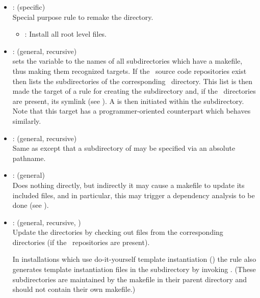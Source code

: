 \begin{itemize}
\item
    : (specific)
   \\ Special purpose rule to remake the  directory.
   \begin{itemize}
   \item
      : Install all root level files.
   \end{itemize}

\item
    : (general, recursive)
   \\  sets the  variable to the names of all
   subdirectories which have a makefile, thus making them recognized targets.
   If the \rcs\ source code repositories exist then  lists
   the subdirectories of the corresponding \rcs\ directory.  This list is
   then made the target of a rule for creating the subdirectory and, if the
   \rcs\ directories are present, its  symlink (see
   ).  A  is then initiated within the
   subdirectory.  Note that this target has a programmer-oriented counterpart
   which behaves similarly.

\item
    : (general, recursive)
   \\ Same as  except that a subdirectory of
    may be specified via an absolute pathname.

\item
    : (general)
   \\ Does nothing directly, but indirectly it may cause a makefile to update
   its included files, and in particular, this may trigger a dependency
   analysis to be done (see ).

\item
    : (general, recursive, \rcs)
   \\ Update the  directories by checking out files from the
   corresponding  directories (if the \rcs\ repositories
   are present).

   In installations which use do-it-yourself template instantiation
   () the  rule also generates
   template instantiation files in the  subdirectory by
   invoking .  (These  subdirectories are
   maintained by the makefile in their parent directory and should not contain
   their own makefile.)


\end{itemize}
